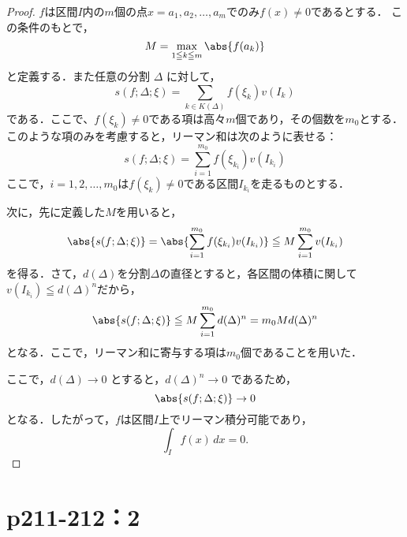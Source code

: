 \documentclass[a4paper,10pt,fleqn]{ltjsarticle}
\begin{document}
\begin{tleftbar}
    \begin{proof}
        $f$は区間$I$内の$m$個の点$x = a_1, a_2, \ldots, a_m$でのみ$f(x) \ne 0$であるとする．
        この条件のもとで，
        \[
            M = \max_{1 \leqq k \leqq m} \abs{f(a_k)}
        \]
        と定義する．また任意の分割 $\Delta$ に対して，
        \[
            s(f; \Delta; \xi) = \sum_{k \in K(\Delta)} f(\xi_k) v(I_k)
        \]
        である．ここで、$f(\xi_k) \ne 0$である項は高々$m$個であり，その個数を$m_0$とする．
        このような項のみを考慮すると，リーマン和は次のように表せる：
        \[
            s(f; \Delta; \xi) = \sum_{i=1}^{m_0} f(\xi_{k_i}) v(I_{k_i})
        \]
        ここで，$i = 1, 2, \ldots, m_0$は$f(\xi_k) \ne 0$である区間$ I_{k_i} $を走るものとする．

        次に，先に定義した$M$を用いると，
        \[
            \abs{s(f; \Delta; \xi)} = \abs{\sum_{i=1}^{m_0} f(\xi_{k_i}) v(I_{k_i})} \leqq M \sum_{i=1}^{m_0} v(I_{k_i})
        \]
        を得る．さて，$d(\Delta)$を分割$\Delta$の直径とすると，各区間の体積に関して$ v(I_{k_i}) \leqq d(\Delta)^n $だから，
        \[
            \abs{s(f; \Delta; \xi)} \leqq M \sum_{i=1}^{m_0} d(\Delta)^n = m_0 M d(\Delta)^n
        \]
        となる．ここで，リーマン和に寄与する項は$m_0$個であることを用いた．

        ここで，$d(\Delta) \to 0$ とすると，$d(\Delta)^n \to 0$ であるため，
        \[
            \abs{s(f; \Delta; \xi)} \to 0
        \]
        となる．したがって，$f$は区間$I$上でリーマン積分可能であり，
        \[
            \int_{I} f(x)\, dx = 0.
        \]
    \end{proof}
\end{tleftbar}

\section*{p211-212：2}
\end{document}
